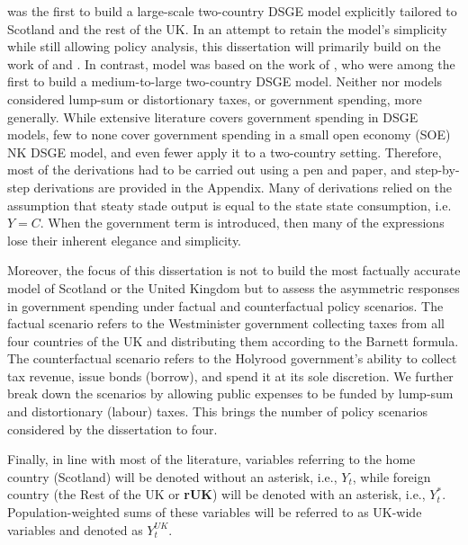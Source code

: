 \textcite{ricci_2019_essays} was the first to build a large-scale two-country DSGE model explicitly tailored to Scotland and the rest of the UK. In an attempt to retain the model's simplicity while still allowing policy analysis, this dissertation will primarily build on the work of \textcite{gali_2005_monetary} and \textcite{jordigal_2015_monetary}. In contrast, \textcite{ricci_2019_essays} model was based on the work of \textcite{rabanal_2010_eurodollar}, who were among the first to build a medium-to-large two-country DSGE model. Neither \textcite{gali_2005_monetary} nor \textcite{jordigal_2015_monetary} models considered lump-sum or distortionary taxes, or government spending, more generally. While extensive literature covers government spending in DSGE models, few to none cover government spending in a small open economy (SOE) NK DSGE model, and even fewer apply it to a two-country setting. Therefore, most of the derivations had to be carried out using a pen and paper, and step-by-step derivations are provided in the Appendix. Many of \textcite{jordigal_2015_monetary} derivations relied on the assumption that steaty stade output is equal to the state state consumption, i.e. $Y=C$. When the government term is introduced, then many of the expressions lose their inherent elegance and simplicity.

Moreover, the focus of this dissertation is not to build the most factually accurate model of Scotland or the United Kingdom but to assess the asymmetric responses in government spending under factual and counterfactual policy scenarios. The factual scenario refers to the Westminister government collecting taxes from all four countries of the UK and distributing them according to the Barnett formula. The counterfactual scenario refers to the Holyrood government's ability to collect tax revenue, issue bonds (borrow), and spend it at its sole discretion. We further break down the scenarios by allowing public expenses to be funded by lump-sum and distortionary (labour) taxes. This brings the number of policy scenarios considered by the dissertation to four.

Finally, in line with most of the literature, variables referring to the home country (Scotland) will be denoted without an asterisk, i.e., $Y_t$, while foreign country (the Rest of the UK or \textbf{rUK}) will be denoted with an asterisk, i.e., $Y^*_t$. Population-weighted sums of these variables will be referred to as UK-wide variables and denoted as $Y_t^{UK}$.